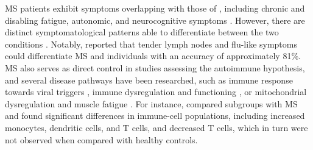 MS patients exhibit symptoms overlapping with those of \cfs, including chronic and disabling fatigue, autonomic, and neurocognitive symptoms \citep{morrisMyalgicEncephalomyelitisChronic2013, gaberMultipleSclerosisChronic2014}.
However, there are distinct symptomatological patterns able to differentiate between the two conditions \citep{jasonDifferentiatingMultipleSclerosis2017, domingues2023AssociationAnalysis}.
Notably, \citet{ohanian2016IdentifyingKey} reported that tender lymph nodes and flu-like symptoms could differentiate MS and \cfs individuals with an accuracy of approximately 81\%.
MS also serves as direct control in \cfs studies assessing the autoimmune hypothesis, and several disease pathways have been researched, such as immune response towards viral triggers \citep{loebel2017SerologicalProfiling}, immune dysregulation and functioning \citep{ramosRegulatoryNaturalKiller2016, cliff2019CellularImmune}, or mitochondrial dysregulation and muscle fatigue \citep{melvin2019CirculatingLevels}.
For instance, \citet{cliff2019CellularImmune} compared \cfs subgroups with MS and found significant differences in immune-cell populations, including increased monocytes, dendritic cells, and \cdfour T cells, and decreased \cdeight T cells, which in turn were not observed when compared with healthy controls.



